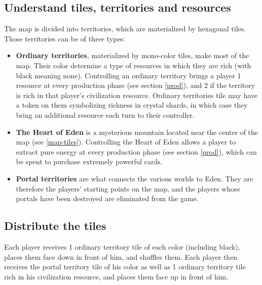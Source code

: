 \documentclass[a4paper]{article}
\begin{document}
    \subsection{Understand tiles, territories and resources}
        The map is divided into territories, which are materialized by hexagonal tiles.
        Those territories can be of three types:
         \vspace{-1.3em}
        \begin{itemize}
            \item \textbf{Ordinary territories}, materialized by mono-color tiles,
                make most of the map.
                Their color determine a type of resources in which they are rich
                (with black meaning none).
                Controlling an ordinary territory brings a player 1 resource at every
                production phase (see section \ref{prod}), and 2 if the territory is rich
                in that player's civilization resource.
                Ordinary territories tile may have a token on them symbolizing richness
                in crystal shards, in which case they bring an additional resource
                each turn to their controller.
            
            \item \textbf{The Heart of Eden} is a mysterious mountain located near
                the center of the map (see \ref{map-tiles}).
                Controlling the Heart of Eden allows a player to extract
                pure energy at every production phase (see section \ref{prod}),
                which can be spent to purchase extremely powerful cards.
            
            \item \textbf{Portal territories} are what connects the various worlds
                to Eden.
                They are therefore the players' starting points on the map,
                and the players whose portals have been destroyed are eliminated from
                the game.
        \end{itemize}   

    \subsection{Distribute the tiles}
        Each player receives 1 ordinary territory tile of each color (including black),
        places them face down in front of him, and shuffles them.
        Each player then receives the portal territory tile of his color
        as well as 1 ordinary territory tile rich in his civilization resource,
        and places them face up in front of him.
        
\end{document}
